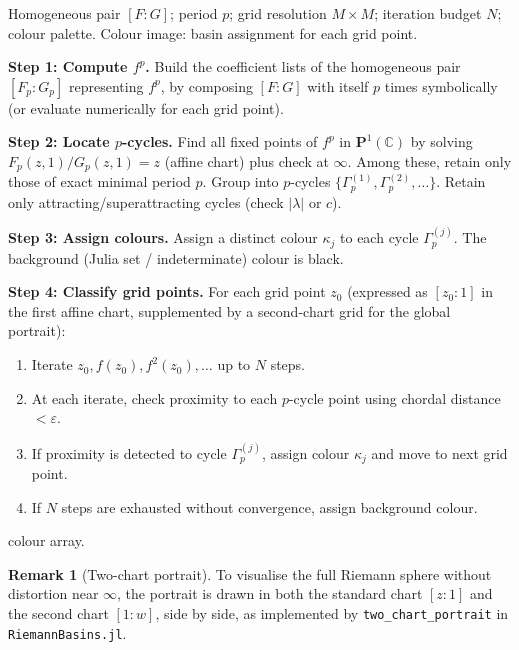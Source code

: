 \documentclass[12pt]{article}
\theoremstyle{definition}
\newtheorem{remark}[theorem]{Remark}
\newcommand{\C}{\mathbb{C}}
\newcommand{\Pone}{\mathbf{P}^1(\C)}
\newcommand{\hpair}{[F:G]}
\begin{document}
\begin{algorithm}[h]
\caption{Basin portrait for $p$-cycles of $f=\hpair$}
\label{alg:basin}
\begin{algorithmic}[1]
\Require Homogeneous pair $\hpair$; period $p$; grid resolution $M\times M$;
         iteration budget $N$; colour palette.
\Ensure Colour image: basin assignment for each grid point.

\State \textbf{Step 1: Compute $f^p$.}
  Build the coefficient lists of the homogeneous pair
  $[F_p:G_p]$ representing $f^p$, by composing $\hpair$ with itself $p$
  times symbolically (or evaluate numerically for each grid point).

\State \textbf{Step 2: Locate $p$-cycles.}
  Find all fixed points of $f^p$ in $\Pone$ by solving
  $F_p(z,1)/G_p(z,1) = z$ (affine chart) plus check at $\infty$.
  Among these, retain only those of exact minimal period $p$.
  Group into $p$-cycles $\{\Gamma^{(1)}_p, \Gamma^{(2)}_p, \ldots\}$.
  Retain only attracting/superattracting cycles (check $|\lambda|$ or $c$).

\State \textbf{Step 3: Assign colours.}
  Assign a distinct colour $\kappa_j$ to each cycle $\Gamma^{(j)}_p$.
  The background (Julia set / indeterminate) colour is black.

\State \textbf{Step 4: Classify grid points.}
  For each grid point $z_0$ (expressed as $[z_0:1]$ in the first
  affine chart, supplemented by a second-chart grid for the global
  portrait):
  \begin{enumerate}[label=\alph*.]
    \item Iterate $z_0, f(z_0), f^2(z_0), \ldots$ up to $N$ steps.
    \item At each iterate, check proximity to each $p$-cycle point
          using chordal distance $<\varepsilon$.
    \item If proximity is detected to cycle $\Gamma^{(j)}_p$, assign
          colour $\kappa_j$ and move to next grid point.
    \item If $N$ steps are exhausted without convergence, assign
          background colour.
  \end{enumerate}

\State \Return colour array.
\end{algorithmic}
\end{algorithm}

\begin{remark}[Two-chart portrait]
To visualise the full Riemann sphere without distortion near $\infty$,
the portrait is drawn in both the standard chart
$[z:1]$ and the second chart $[1:w]$, side by side, as implemented by
\texttt{two\_chart\_portrait} in \texttt{RiemannBasins.jl}.
\end{remark}
\end{document}

